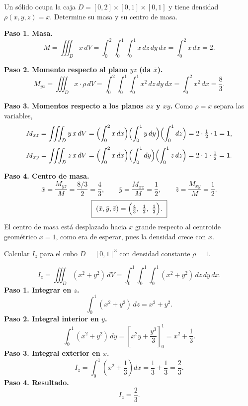 \begin{prob}
Un sólido ocupa la caja $D=[0,2]\times[0,1]\times[0,1]$ y tiene densidad
$\rho(x,y,z)=x$. Determine su masa y su centro de masa.
\begin{myproof}
\textbf{Paso 1. Masa.}
\[
M=\iiint_D x\,dV=\int_0^2\!\!\int_0^1\!\!\int_0^1 x\,dz\,dy\,dx
=\int_0^2 x\,dx=2.
\]

\textbf{Paso 2. Momento respecto al plano $yz$ (da $\bar x$).}
\[
M_{yz}=\iiint_D x\cdot\rho\,dV=\int_0^2\!\!\int_0^1\!\!\int_0^1 x^2\,dz\,dy\,dx
=\int_0^2 x^2\,dx=\frac83.
\]

\textbf{Paso 3. Momentos respecto a los planos $xz$ y $xy$.}
Como $\rho=x$ separa las variables,
\[
M_{xz}=\iiint_D y\,x\,dV=\Bigl(\int_0^2 x\,dx\Bigr)\Bigl(\int_0^1 y\,dy\Bigr)\Bigl(\int_0^1 dz\Bigr)=2\cdot\tfrac12\cdot1=1,
\]
\[
M_{xy}=\iiint_D z\,x\,dV=\Bigl(\int_0^2 x\,dx\Bigr)\Bigl(\int_0^1 dy\Bigr)\Bigl(\int_0^1 z\,dz\Bigr)=2\cdot1\cdot\tfrac12=1.
\]

\textbf{Paso 4. Centro de masa.}
\[
\bar x=\frac{M_{yz}}{M}=\frac{8/3}{2}=\frac43,\qquad
\bar y=\frac{M_{xz}}{M}=\frac12,\qquad
\bar z=\frac{M_{xy}}{M}=\frac12.
\]
\[
\boxed{\ (\bar x,\bar y,\bar z)=\Bigl(\tfrac43,\ \tfrac12,\ \tfrac12\Bigr).\ }
\]
El centro de masa está desplazado hacia $x$ grande respecto al centroide
geométrico $x=1$, como era de esperar, pues la densidad crece con $x$.
\end{myproof}
\end{prob}

\begin{example}
Calcular \(I_z\) para el cubo \(D = [0,1]^3\) con densidad constante \(\rho = 1\).
\begin{myproof}
\[
I_z = \iiint_D (x^2+y^2)\,dV
= \int_{0}^{1}\int_{0}^{1}\int_{0}^{1} (x^2+y^2)\,dz\,dy\,dx.
\]
\textbf{Paso 1. Integrar en $z$.}
\[
\int_{0}^{1} (x^2+y^2)\,dz = x^2+y^2.
\]
\textbf{Paso 2. Integral interior en $y$.}
\[
\int_{0}^{1} (x^2+y^2)\,dy = \left[x^2 y + \frac{y^3}{3}\right]_{0}^{1} = x^2 + \frac{1}{3}.
\]
\textbf{Paso 3. Integral exterior en $x$.}
\[
I_z = \int_{0}^{1}\left(x^2 + \frac{1}{3}\right) dx = \frac{1}{3} + \frac{1}{3} = \frac{2}{3}.
\]
\textbf{Paso 4. Resultado.}
\[
\boxed{I_z = \frac{2}{3}.}
\]
\end{myproof}
\end{example}



